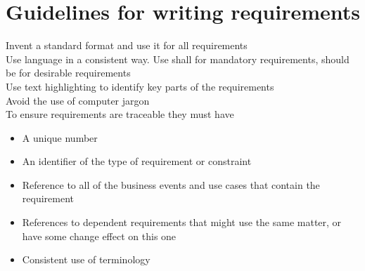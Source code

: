 \documentclass{article}[18pt]
\begin{document}
\section{Guidelines for writing requirements}
Invent a standard format and use it for all requirements\\
Use language in a consistent way. Use shall for mandatory requirements, should be for desirable requirements\\
Use text highlighting to identify key parts of the requirements\\
Avoid the use of computer jargon\\
To ensure requirements are traceable they must have
\begin{itemize}
	\item A unique number
	\item An identifier of the type of requirement or constraint
	\item Reference to all of the business events and use cases that contain the requirement
	\item References to dependent requirements that might use the same matter, or have some change effect on this one
	\item Consistent use of terminology
\end{itemize}
\end{document}
